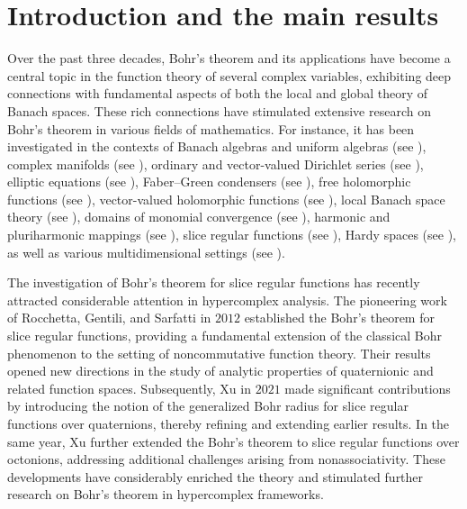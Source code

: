 \documentclass[a4paper,11pt, reqno]{amsart}
\theoremstyle{definition}
\begin{document}
	\section{Introduction and the main results}\label{section-1}
	Over the past three decades, Bohr's theorem and its applications have become a central topic in the function theory of several complex variables, exhibiting deep connections with fundamental aspects of both the local and global theory of Banach spaces. These rich connections have stimulated extensive research on Bohr's theorem in various fields of mathematics. For instance, it has been investigated in the contexts of Banach algebras and uniform algebras (see \cite{paulsen-2002,paulsen-2004}), complex manifolds (see \cite{aizn-2000b,aizenberg-2001a}), ordinary and vector-valued Dirichlet series (see \cite{bala-2006,defant-2008}), elliptic equations (see \cite{aizenberg-2001b}), Faber–Green condensers (see \cite{lassere-2017}), free holomorphic functions (see \cite{popescu-2019}), vector-valued holomorphic functions (see \cite{defant-2011}), local Banach space theory (see \cite{defant-2003,defant-2025-TAMS}), domains of monomial convergence (see \cite{defant-2009}), harmonic and pluriharmonic mappings (see \cite{hamada-JFA-2022}), slice regular functions (see \cite{Rocchetta-Slice-Bohr-Math-Nachr,Xu-quaternion-AMPA,Xu-quaternion-PRSESA}), Hardy spaces (see \cite{bene-2004}), as well as various multidimensional settings (see \cite{aizn-2000a,boas-1997,boas-2000,defant-2004,defant-2006}). 
	\par 
	The investigation of Bohr's theorem for slice regular functions has recently attracted considerable attention in hypercomplex analysis. The pioneering work of Rocchetta, Gentili, and Sarfatti \cite{Rocchetta-Slice-Bohr-Math-Nachr} in $2012$ established the Bohr's theorem for slice regular functions, providing a fundamental extension of the classical Bohr phenomenon to the setting of noncommutative function theory. Their results opened new directions in the study of analytic properties of quaternionic and related function spaces. Subsequently, Xu \cite{Xu-quaternion-AMPA} in $2021$  made significant contributions by introducing the notion of the generalized Bohr radius for slice regular functions over quaternions, thereby refining and extending earlier results. In the same year, Xu \cite{Xu-quaternion-PRSESA} further extended the Bohr's theorem to slice regular functions over octonions, addressing additional challenges arising from nonassociativity. These developments have considerably enriched the theory and stimulated further research on Bohr's theorem in hypercomplex frameworks.
\end{document}
